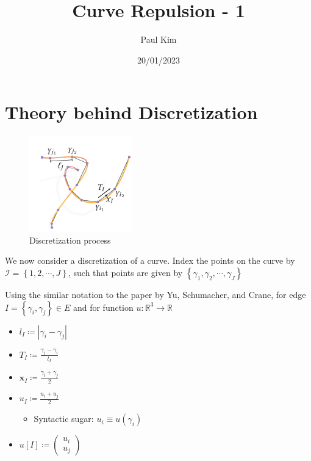\documentclass[a4paper, 11pt]{article}
\title{Curve Repulsion - 1}
\date{20/01/2023}
\author{Paul Kim}
\newcommand{\x}{\mathbf{x}}
\theoremstyle{definition}
\theoremstyle{remark}
\begin{document}
\maketitle

\section{Theory behind Discretization}
\begin{figure}[h]
    \centering
    \includegraphics[scale=0.5]{discretization.png}
    \caption{Discretization process}
\end{figure}
We now consider a discretization of a curve.
Index the points on the curve by $\mathcal{I} = \left\{ 1, 2, \cdots,  J \right\}$, such that
points are given by $\left\{ \gamma_1, \gamma_2, \cdots, \gamma_J \right\}$

Using the similar notation to the paper by Yu, Schumacher, and Crane,
for edge $I = \left\{ \gamma_i, \gamma_j \right\} \in E$
and for function $u: \mathbb{R}^3 \rightarrow \mathbb{R}$
\begin{itemize}
    \item $l_I \coloneqq | \gamma_i - \gamma_j |$
    \item $T_I \coloneqq \frac{\gamma_j - \gamma_i}{l_I}$
    \item $\x_I \coloneqq \frac{\gamma_i + \gamma_j}{2}$
    \item $u_I \coloneqq \frac{u_i + u_j}{2}$
        \begin{itemize}
            \item Syntactic sugar: $u_i \equiv u\left( \gamma_i \right)$
        \end{itemize}
    \item $u[I] \coloneqq 
        \begin{pmatrix}
            u_i \\
            u_j
        \end{pmatrix}
        $
\end{itemize}
\end{document}
